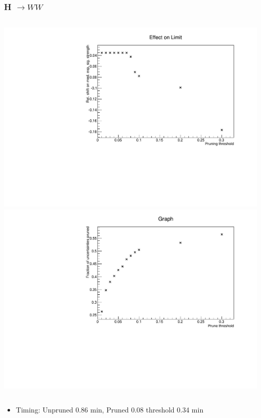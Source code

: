 \documentclass[hyperref=colorlinks]{beamer}
\begin{document}
\begin{frame}
  \frametitle{H $\rightarrow WW $}
  \begin{columns}
    \includegraphics[width=\textwidth]{TalkPics/hwwshift.pdf}
    \includegraphics[width=\textwidth]{TalkPics/hwwprop.pdf}
  \end{columns}
  \begin{itemize}
  \item Timing: Unpruned 0.86 min, Pruned 0.08 threshold 0.34 min
  \end{itemize}
\end{frame}
\end{document}
